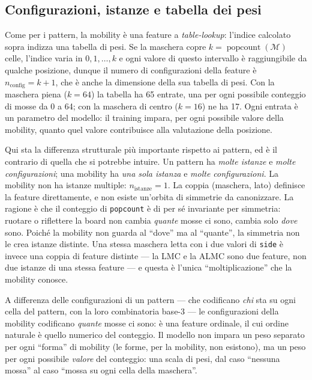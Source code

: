 \subsection{Configurazioni, istanze e tabella dei pesi}

Come per i pattern, la mobility è una feature a \textit{table-lookup}: l'indice
calcolato sopra indizza una tabella di pesi. Se la maschera copre $k =
\operatorname{popcount}(\mathcal{M})$ celle, l'indice varia in $0, 1, \ldots, k$ e
ogni valore di questo intervallo è raggiungibile da qualche posizione, dunque il numero
di configurazioni della feature è $n_{\text{config}} = k + 1$, che è anche la
dimensione della sua tabella di pesi. Con la maschera piena ($k = 64$) la tabella ha 65
entrate, una per ogni possibile conteggio di mosse da 0 a 64; con la maschera di centro
($k = 16$) ne ha 17. Ogni entrata è un parametro del modello: il training impara, per
ogni possibile valore della mobility, quanto quel valore contribuisce alla valutazione
della posizione.

Qui sta la differenza strutturale più importante rispetto ai pattern, ed è il contrario
di quella che si potrebbe intuire. Un pattern ha \textit{molte istanze} e
\textit{molte configurazioni}; una mobility ha \textit{una sola istanza} e
\textit{molte configurazioni}. La mobility non ha istanze multiple:
$n_{\text{istanze}} = 1$. La coppia (maschera, lato) definisce la feature
direttamente, e non esiste un'orbita di simmetrie da canonizzare. La ragione è che il
conteggio di \texttt{popcount} è di per sé invariante per simmetria: ruotare o
riflettere la board non cambia \textit{quante} mosse ci sono, cambia solo
\textit{dove} sono. Poiché la mobility non guarda al ``dove'' ma al ``quante'', la
simmetria non le crea istanze distinte. Una stessa maschera letta con i due valori di
\texttt{side} è invece una coppia di feature distinte --- la LMC e la ALMC sono due
feature, non due istanze di una stessa feature --- e questa è l'unica
``moltiplicazione'' che la mobility conosce.

A differenza delle configurazioni di un pattern --- che codificano \textit{chi} sta su
ogni cella del pattern, con la loro combinatoria base-3 --- le configurazioni della
mobility codificano \textit{quante} mosse ci sono: è una feature ordinale, il cui
ordine naturale è quello numerico del conteggio. Il modello non impara un peso
separato per ogni ``forma'' di mobility (le forme, per la mobility, non esistono), ma
un peso per ogni possibile \textit{valore} del conteggio: una scala di pesi, dal caso
``nessuna mossa'' al caso ``mossa su ogni cella della maschera''.

